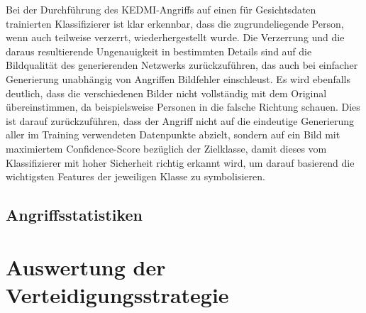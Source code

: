 Bei der Durchführung des \glqq KEDMI\grqq-Angriffs auf einen für Gesichtsdaten trainierten Klassifizierer ist klar erkennbar, dass die zugrundeliegende Person, wenn auch teilweise verzerrt, wiederhergestellt wurde. Die Verzerrung und die daraus resultierende Ungenauigkeit in bestimmten Details sind auf die Bildqualität des generierenden Netzwerks zurückzuführen, das auch bei einfacher Generierung unabhängig von Angriffen Bildfehler einschleust. Es wird ebenfalls deutlich, dass die verschiedenen Bilder nicht vollständig mit dem Original übereinstimmen, da beispielsweise Personen in die \glqq falsche\grqq{} Richtung schauen. Dies ist darauf zurückzuführen, dass der Angriff nicht auf die eindeutige Generierung aller im Training verwendeten Datenpunkte abzielt, sondern auf ein Bild mit maximiertem Confidence-Score bezüglich der Zielklasse, damit dieses vom Klassifizierer mit hoher Sicherheit richtig erkannt wird, um darauf basierend die wichtigsten Features der jeweiligen Klasse zu symbolisieren. 

\subsection{Angriffsstatistiken}
\section{Auswertung der Verteidigungsstrategie}



